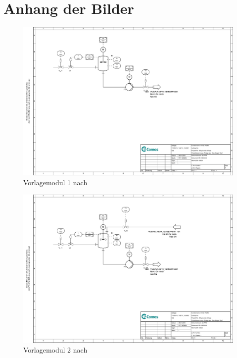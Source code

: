 \chapter{Anhang der Bilder}
\label{cha:anhang_bilder}
\begin{figure}[h!tb]
\centering
\includegraphics[height=\textwidth,angle=90]{bilder/M01_Vorlage_1_mit_Pumpe.pdf}
\caption[PID Modul 1]{Vorlagemodul 1 nach \cite{Pfeffer_2016}}
\label{fig:PIDMod1}
\end{figure}

\begin{figure}[h!tb]
\centering
\includegraphics[height=\textwidth,angle=90]{bilder/M02_Vorlage_2_mit_Pumpe.pdf}
\caption[PID Modul 2]{Vorlagemodul 2 nach \cite{Pfeffer_2016}}
\label{fig:PIDMod2}
\end{figure}

